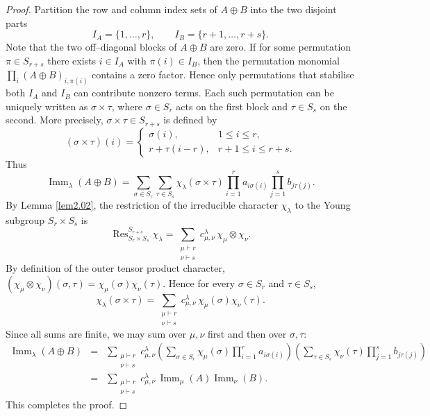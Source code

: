 \documentclass[11pt,a4paper]{article}
\begin{document}
\begin{proof}
Partition the row and column index sets of $A\oplus B$ into the two disjoint parts
\[
  I_A=\{1,\ldots,r\},
  \qquad
  I_B=\{r+1,\ldots,r+s\}.
\]
Note that the two off–diagonal blocks of $A\oplus B$ are zero. If for some permutation $\pi\in S_{r+s}$ there exists $i\in I_A$ with $\pi(i)\in I_B$, then the permutation monomial $\prod_i(A\oplus B)_{i,\pi(i)}$ contains a zero factor. Hence only permutations that stabilise both $I_A$ and $I_B$ can contribute nonzero terms. Each such permutation can be uniquely written as $\sigma\times\tau$, where $\sigma\in S_r$ acts on the first block and $\tau\in S_s$ on the second. More precisely, $\sigma\times\tau\in S_{r+s}$ is defined by
\[
  (\sigma\times\tau)(i)=
  \begin{cases}
    \sigma(i),&1\leq i\leq r,\\
    r+\tau(i-r),&r+1\leq i\leq r+s.
  \end{cases}
\]
Thus
\[
  \operatorname{Imm}_\lambda(A\oplus B)
  =\sum_{\sigma\in S_r}\sum_{\tau\in S_s}
  \chi_{\lambda}(\sigma\times\tau)
  \prod_{i=1}^r a_{i\sigma(i)}
  \prod_{j=1}^s b_{j\tau(j)}.
\]
By Lemma \ref{lem2.02}, the restriction of the irreducible character $\chi_\lambda$ to the Young subgroup $S_r\times S_s$ is
\[
  \operatorname{Res}^{S_{r+s}}_{S_r\times S_s}\chi_\lambda
  =\sum_{\substack{\mu\vdash r\\\nu\vdash s}}
    c_{\mu,\nu}^{\lambda}\,\chi_\mu\otimes\chi_\nu.
\]
By definition of the outer tensor product character, $(\chi_\mu\otimes\chi_\nu)(\sigma,\tau)=\chi_\mu(\sigma)\chi_\nu(\tau)$. Hence for every $\sigma\in S_r$ and $\tau\in S_s$,
\[
  \chi_{\lambda}(\sigma\times\tau)
  =\sum_{\substack{\mu\vdash r\\\nu\vdash s}}
    c_{\mu,\nu}^{\lambda}\,\chi_{\mu}(\sigma)\chi_{\nu}(\tau).
\]
Since all sums are finite, we may sum over $\mu,\nu$ first and then over $\sigma,\tau$:
\begin{eqnarray*}
  \operatorname{Imm}_\lambda(A\oplus B)
  &=&\sum_{\substack{\mu\vdash r\\\nu\vdash s}}
    c_{\mu,\nu}^{\lambda}
    \left(\sum_{\sigma\in S_r}\chi_{\mu}(\sigma)
      \prod_{i=1}^r a_{i\sigma(i)}\right)
    \left(\sum_{\tau\in S_s}\chi_{\nu}(\tau)
      \prod_{j=1}^s b_{j\tau(j)}\right)  \\
  &=&\sum_{\substack{\mu\vdash r\\\nu\vdash s}}
    c_{\mu,\nu}^{\lambda}\,\operatorname{Imm}_\mu(A)\operatorname{Imm}_\nu(B).
\end{eqnarray*}
This completes the proof. 
\end{proof}
\end{document}
